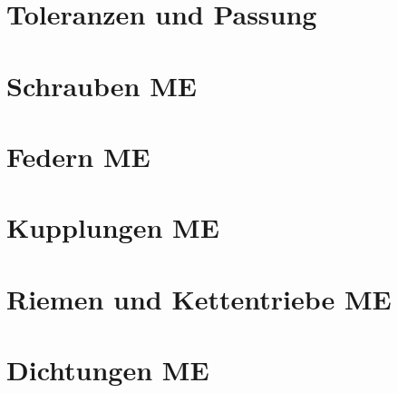 \documentclass[numerate]{cheatsheet}
\begin{document}
\section{Toleranzen und Passung}
    
    
    
    

\section{Schrauben \hfill ME}
    
    
    
    
    
    
    
    
    
    
    
    
    

\section{Federn \hfill ME}
    
    
    
    
    
    
    

\section{Kupplungen \hfill ME}
    
    

\section{Riemen und Kettentriebe \hfill ME}
    


\section{Dichtungen \hfill ME}
    
\end{document}

